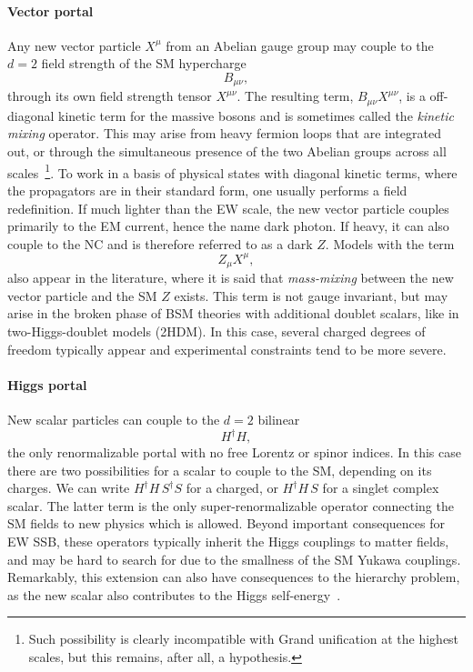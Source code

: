 \paragraph{Vector portal} Any new vector particle $X^\mu$ from an Abelian gauge group may couple to the $d=2$ field strength of the SM hypercharge
\begin{equation}
B_{\mu\nu},
\end{equation}
through its own field strength tensor $X^{\mu\nu}$. The resulting term, $B_{\mu\nu} X^{\mu\nu}$, is a off-diagonal kinetic term for the massive bosons and is sometimes called the \emph{kinetic mixing} operator. This may arise from heavy fermion loops that are integrated out, or through the simultaneous presence of the two Abelian groups across all scales~\footnote{Such possibility is clearly incompatible with Grand unification at the highest scales, but this remains, after all, a hypothesis.}. To work in a basis of physical states with diagonal kinetic terms, where the propagators are in their standard form, one usually performs a field redefinition. If much lighter than the EW scale, the new vector particle couples primarily to the EM current, hence the name dark photon. If heavy, it can also couple to the NC and is therefore referred to as a dark $Z$. Models with the term 
%
\begin{equation}
 Z_\mu X^\mu,
\end{equation}
%
also appear in the literature, where it is said that \emph{mass-mixing} between the new vector particle and the SM $Z$ exists. This term is not gauge invariant, but may arise in the broken phase of BSM theories with additional doublet scalars, like in two-Higgs-doublet models (2HDM). In this case, several charged degrees of freedom typically appear and experimental constraints tend to be more severe.

\paragraph{Higgs portal} New scalar particles can couple to the $d=2$ bilinear 
%
\begin{equation}
 H^\dagger H,
\end{equation}
%
the only renormalizable portal with no free Lorentz or spinor indices. In this case there are two possibilities for a scalar to couple to the SM, depending on its charges. We can write  $H^\dagger H \, S^\dagger S$ for a charged, or $H^\dagger H\, S $ for a singlet complex scalar. The latter term is the only super-renormalizable operator connecting the SM fields to new physics which is allowed. Beyond important consequences for EW SSB, these operators typically inherit the Higgs couplings to matter fields, and may be hard to search for due to the smallness of the SM Yukawa couplings. Remarkably, this extension can also have consequences to the hierarchy problem, as the new scalar also contributes to the Higgs self-energy~\cite{Craig:2013xia}.


